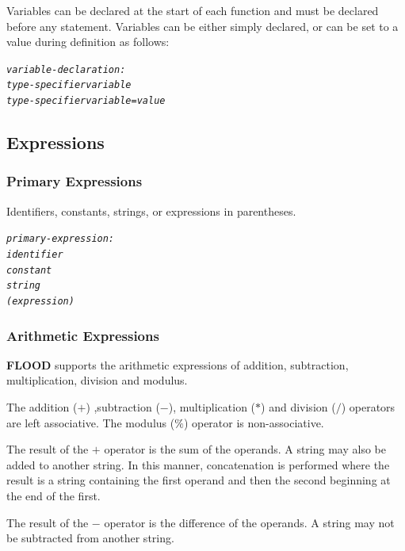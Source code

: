 \documentclass[12pt]{report}
\begin{document}
Variables can be declared at the start of each function and must be declared before any statement. Variables can be either simply declared, or can be set to a value during definition as follows:

\begin{alltt}\begin{singlespace}
         \textit{variable-declaration:}
              \textit{type-specifier variable}
              \textit{type-specifier variable = value}\end{singlespace}
\end{alltt}

\subsection{Expressions}

\subsubsection{Primary Expressions}

Identifiers, constants, strings, or expressions in parentheses.

\begin{alltt}\begin{singlespace}
         \textit{primary-expression:}
            \textit{identifier}
            \textit{constant}
            \textit{string}
            \textit{( expression )}\end{singlespace}
\end{alltt}

\subsubsection{Arithmetic Expressions}

\textbf{FLOOD} supports the arithmetic expressions of addition, subtraction, multiplication, division and modulus.

The addition ($+$) ,subtraction ($-$), multiplication ($*$) and division ($/$) operators are left associative. The modulus ($\%$) operator is non-associative.

The result of the $+$ operator is the sum of the operands. A string may also be added to another string. In this manner, concatenation is performed where the result is a string containing the first operand and then the second beginning at the end of the first.

The result of the $-$ operator is the difference of the operands. A string may not be subtracted from another string.
\end{document}
